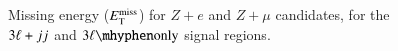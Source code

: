 \begin{appendices}
\begin{figure}[htb]
{  }
  \caption{Missing energy ($E_{\text{T}}^{\text{miss}}$) for $Z+e$ and $Z+\mu$ candidates, for the $3\ell+jj$ and $\threelo$ signal regions.}
  \label{fig:SR-ETMiss-2}
\end{figure}

\clearpage


\end{appendices}

